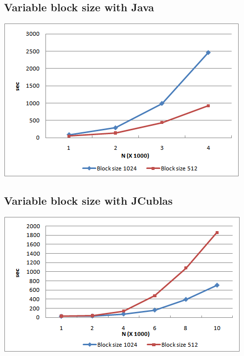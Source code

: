 \documentclass[a4paper]{article}
\begin{document}
\begin{multicols}{2}
\subsection{Variable block size with Java}
\begin{minipage}{\linewidth}
	\centering
	\includegraphics[width=0.9\linewidth]{chart-java-with-variable-block-size.png}
	\label{fig:java-blocksize}
\end{minipage}
\subsection{Variable block size with JCublas}
\begin{minipage}{\linewidth}
	\centering
	\includegraphics[width=0.9\linewidth]{chart-jcublas-with-variable-block-size.png}
	\label{fig:jcublas-blocksize}
\end{minipage}


\end{multicols}
\end{document}
